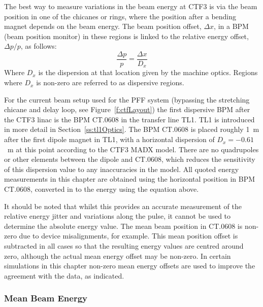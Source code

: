The best way to measure variations in the beam energy at CTF3 is via the beam position in one of the chicanes or rings, where the position after a bending magnet depends on the beam energy. The beam position offset, \(\Delta x\), in a BPM (beam position monitor) in these regions is linked to the relative energy offset, \(\Delta p / p\), as follows:
\begin{equation}
\frac{\Delta p}{p} = \frac{\Delta x}{D_x}
\end{equation}
Where \(D_{x}\) is the dispersion at that location given by the machine optics. Regions where \(D_{x}\) is non-zero are referred to as dispersive regions.

For the current beam setup used for the PFF system (bypassing the stretching chicane and delay loop, see Figure~\ref{f:ctfLayout}) the first dispersive BPM after the CTF3 linac is the BPM CT.0608 in the transfer line TL1.  TL1 is introduced in more detail in Section~\ref{ss:tl1Optics}. The BPM CT.0608 is placed roughly 1~m after the first dipole magnet in TL1, with a horizontal dispersion of \(D_{x} = -0.61\)~m at this point according to the CTF3 MADX model. There are no quadrupoles or other elements between the dipole and CT.0608, which reduces the sensitivity of this dispersion value to any inaccuracies in the model. All quoted energy measurements in this chapter are obtained using the horizontal position in BPM CT.0608, converted in to the energy using the equation above. %

It should be noted that whilst this provides an accurate measurement of the relative energy jitter and variations along the pulse, it cannot be used to determine the absolute energy value. The mean beam position in CT.0608 is non-zero due to device misalignments, for example. This mean position offset is subtracted in all cases so that the resulting energy values are centred around zero, although the actual mean energy offset may be non-zero. In certain simulations in this chapter non-zero mean energy offsets are used to improve the agreement with the data, as indicated.

\subsubsection{Mean Beam Energy}

